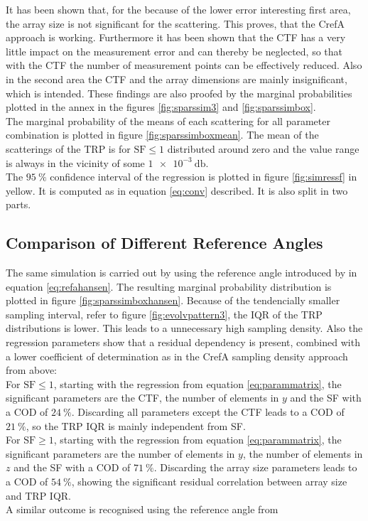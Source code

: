 It has been shown that, for the because of the lower error interesting first area, the array size is not significant for the scattering. This proves, that the \ac{CrefA} approach is working. Furthermore it has been shown that the \ac{CTF} has a very little impact on the measurement error and can thereby be neglected, so that with the \ac{CTF} the number of measurement points can be effectively reduced. Also in the second area the \ac{CTF} and the array dimensions are mainly insignificant, which is intended. These findings are also proofed by the marginal probabilities plotted in the annex in the figures \ref{fig:sparssim3} and \ref{fig:sparssimbox}.\\
The marginal probability of the means of each scattering for all parameter combination is plotted in figure \ref{fig:sparssimboxmean}. The mean of the scatterings of the \ac{TRP} is for $\text{SF} \le 1$ distributed around zero and the value range is always in the vicinity of some $\SI{1e-3}{\decibel}$.\\
The $\SI{95}{\percent}$ confidence interval of the regression is plotted in figure \ref{fig:simressf} in yellow. It is computed as in equation \ref{eq:conv} described. It is also split in two parts.

\subsection{Comparison of Different Reference Angles}

The same simulation is carried out by using the reference angle introduced by \cite{hansen} in equation \ref{eq:refahansen}. The resulting marginal probability distribution is plotted in figure \ref{fig:sparssimboxhansen}. Because of the tendencially smaller sampling interval, refer to figure \ref{fig:evolvpattern3}, the \ac{IQR} of the \ac{TRP} distributions is lower. This leads to a unnecessary high sampling density. Also the regression parameters show that a residual dependency is present, combined with a lower coefficient of determination as in the \ac{CrefA} sampling density approach from above:\\
For $\text{SF}\le 1$, starting with the regression from equation \ref{eq:parammatrix}, the significant parameters are the \ac{CTF}, the number of elements in $y$ and the \ac{SF} with a \ac{COD} of $\SI{24}{\percent}$. Discarding all parameters except the \ac{CTF} leads to a \ac{COD} of $\SI{21}{\percent}$, so the \ac{TRP} \ac{IQR} is mainly independent from \ac{SF}.\\
For $\text{SF}\ge 1$, starting with the regression from equation \ref{eq:parammatrix}, the significant parameters are the number of elements in $y$, the number of elements in $z$ and the \ac{SF} with a \ac{COD} of $\SI{71}{\percent}$. Discarding the array size parameters leads to a \ac{COD} of $\SI{54}{\percent}$, showing the significant residual correlation between array size and \ac{TRP} \ac{IQR}.\\
A similar outcome is recognised using the reference angle from \cite{2018arXiv180310993F} 


